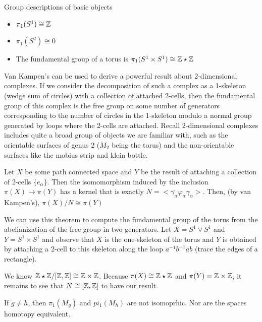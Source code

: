 \documentclass[10pt]{article}
\begin{document}
\begin{note}Group descriptions of basic objects
	\begin{itemize}
		\item{$\pi_1(S^1) \cong \mathbb{Z}$}
		\item{$\pi_1(S^2) \cong 0$}
		\item{The fundamental group of a torus is $\pi_1(S^1 \times S^1) \cong \mathbb{Z} \star \mathbb{Z}$}
	\end{itemize}
\end{note}

Van Kampen's can be used to derive a powerful result about 2-dimensional complexes. If we consider the decomposition of such a complex as a 1-skeleton (wedge sum of circles) with a collection of attached 2-cells, then the fundamental group of this complex is the free group on some number of generators corresponding to the number of circles in the 1-skeleton modulo a normal group generated by loops where the 2-cells are attached. Recall 2-dimensional complexes includes quite a broad group of objects we are familiar with, such as the orientable surfaces of genus 2 ($M_2$ being the torus) and the non-orientable surfaces like the mobius strip and klein bottle.

\begin{theorem}
	Let $X$ be some path connected space and $Y$ be the result of attaching a
	collection of 2-cells $\{e_{\alpha}\}$. Then the isomomorphism induced by the
	inclusion $\pi(X) \to \pi(Y)$ has a kernel that is exactly $N = <
	\bar{\gamma_{\alpha}}\varphi_{\alpha}\gamma_{\alpha} >$. Then, (by van
	Kampen's), $\pi(X) / N \cong \pi(Y)$
\end{theorem}

We can use this theorem to compute the fundamental group of the torus from the abelianization of the free group in two generators. Let $X = S^1 \vee S^1$ and $Y = S^1 \times S^1$ and observe that $X$ is the one-skeleton of the torus and $Y$ is obtained by attaching a 2-cell to this skeleton along the loop $a^{-1}b^{-1}ab$ (trace the edges of a rectangle).

We know $\mathbb{Z} \star \mathbb{Z} / [\mathbb{Z}, \mathbb{Z}]  \cong \mathbb{Z} \times \mathbb{Z}$. Because $\pi(X) \cong \mathbb{Z} \star \mathbb{Z}$ and $\pi(Y) = \mathbb{Z} \times \mathbb{Z}$, it remains to see that $N \cong [\mathbb{Z}, \mathbb{Z}]$ to have our result. 


\begin{theorem}
	If $g \neq h$, then $\pi_1(M_g)$ and $pi_1(M_h)$ are not isomoprhic. Nor are the spaces homotopy equivalent.
\end{theorem}
\end{document}
